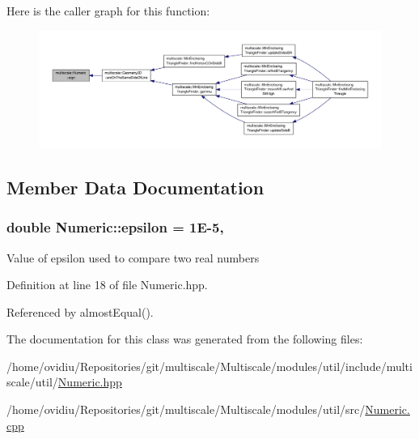 Here is the caller graph for this function\-:\nopagebreak
\begin{figure}[H]
\begin{center}
\leavevmode
\includegraphics[width=350pt]{classmultiscale_1_1Numeric_a2b3058c5ad27aaaef338a29b96cdbced_icgraph}
\end{center}
\end{figure}




\subsection{Member Data Documentation}
\hypertarget{classmultiscale_1_1Numeric_ac66cc2092ff149af068ac93aa3a6cc51}{
\subsubsection[{epsilon}]{\setlength{\rightskip}{0pt plus 5cm}double Numeric\-::epsilon = 1\-E-\/5\hspace{0.3cm}{\ttfamily [static]}, {\ttfamily [private]}}}\label{classmultiscale_1_1Numeric_ac66cc2092ff149af068ac93aa3a6cc51}
Value of epsilon used to compare two real numbers 

Definition at line 18 of file Numeric.\-hpp.



Referenced by almost\-Equal().



The documentation for this class was generated from the following files\-:\begin{DoxyCompactItemize}
\item 
/home/ovidiu/\-Repositories/git/multiscale/\-Multiscale/modules/util/include/multiscale/util/\hyperlink{Numeric_8hpp}{Numeric.\-hpp}\item 
/home/ovidiu/\-Repositories/git/multiscale/\-Multiscale/modules/util/src/\hyperlink{Numeric_8cpp}{Numeric.\-cpp}\end{DoxyCompactItemize}
